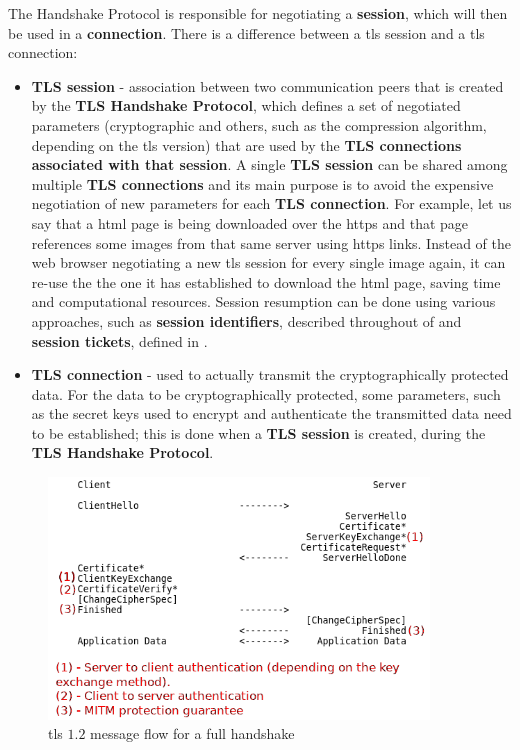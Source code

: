 \documentclass{llncs}
\begin{document}
The Handshake Protocol is responsible for negotiating a \textbf{session},
which will then be used in a \textbf{connection}.
There is a difference between a \gls{tls} session and a \gls{tls} connection:
\begin{itemize}
  \item \textbf{TLS session} - association between two communication peers that is
  created by the \textbf{TLS Handshake Protocol}, which defines a set of negotiated parameters
  (cryptographic and others, such as
  the compression algorithm, depending on the \gls{tls} version) that are used by the \textbf{TLS connections associated
  with that session}. A single \textbf{TLS session} can be shared among multiple
  \textbf{TLS connections} and its main purpose is to avoid the expensive negotiation
  of new parameters for each \textbf{TLS connection}. For example, let us say
  that a \gls{html} page is being downloaded over the \gls{https} and that page references some images from that same server using \gls{https} links. Instead of the web browser negotiating a new \gls{tls} session for every single image again, it can re-use the the
  one it has established to download the \gls{html} page,
  saving time and computational resources. Session resumption can be done using various
  approaches, such as \textbf{session identifiers}, described throughout 
  of \cite{RFC5246} and \textbf{session tickets}, defined in
  \cite{RFC5077}.
  \item \textbf{TLS connection} - used to actually transmit the cryptographically
  protected data. For the data to be cryptographically protected, some parameters,
  such as the secret keys used to encrypt and authenticate the transmitted
  data need to be established; this is done when a \textbf{TLS session} is created,
  during the \textbf{TLS Handshake Protocol}.
\end{itemize}

\begin{figure}
        \centering
        \includegraphics[width=0.9\textwidth]{img/tls-12-full-handshake2.png} %
        \caption{\label{fig:tls-12-handshake} \gls{tls} $1.2$ message flow for a full handshake}
\end{figure}
\end{document}
